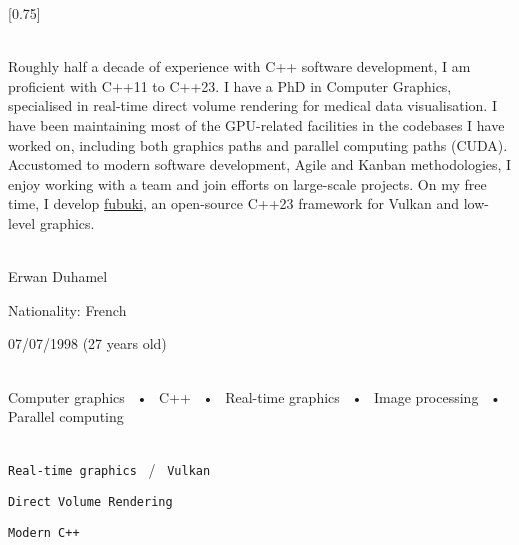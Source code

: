 \documentclass[lighthipster]{simplehipstercv}
\begin{document}
\setlength{\columnsep}{1.5cm}
[0.75]
\begin{paracol}{2}

\paracolbackgroundoptions


\footnotesize
{\setasidefontcolour
\begin{center}
    \vspace{-4.3cm}
\end{center}

\\[0.5em]
{\footnotesize
Roughly half a decade of experience with C++ software development, I am proficient with C++11 to C++23.
I have a PhD in Computer Graphics, specialised in real-time direct volume rendering for medical data visualisation.
I have been maintaining most of the GPU-related facilities in the codebases I have worked on, including both graphics paths and parallel computing paths (CUDA).
Accustomed to modern software development, Agile and Kanban methodologies, I enjoy working with a team and join efforts on large-scale projects. 
On my free time, I develop \href{https://github.com/Erellu/fubuki}{\faGithub fubuki}, an open-source C++23 framework for Vulkan and low-level graphics.
}
\bigskip

 \\[0.5em]
    Erwan Duhamel
    
    Nationality: French 
    
    07/07/1998 (27 years old)

\bigskip

 \\[0.5em]

Computer graphics ~•~ C++ ~•~ Real-time graphics ~•~ Image processing ~•~ Parallel computing

\bigskip

\\[0.5em]

\texttt{Real-time graphics} ~/~ \texttt{Vulkan}

\texttt{Direct Volume Rendering}

\texttt{Modern C++}

\bigskip

}
\end{paracol}
\end{document}
